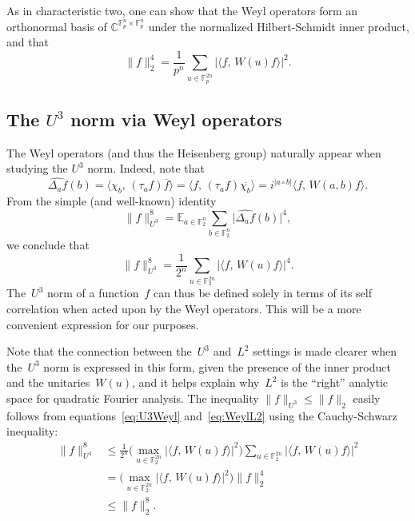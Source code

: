 \documentclass[11pt]{amsart}
\newcommand{\E}{\mathbb{E}}
\newcommand{\C}{\mathbb{C}} %
\newcommand{\F}{\mathbb{F}} %
\theoremstyle{plain}
\theoremstyle{definition}
\theoremstyle{remark}
\begin{document}
As in characteristic two, one can show that the Weyl operators form an orthonormal basis of $\C^{\F_p^n \times \F_p^n}$ under the normalized Hilbert-Schmidt inner product, and that
\begin{equation*}
\|f\|_2^4 = \frac{1}{p^n} \sum_{u\in \F_p^{2n}} |\langle f,\, W(u) f\rangle|^2.    
\end{equation*}


\subsection{The $U^3$ norm via Weyl operators}

The Weyl operators (and thus the Heisenberg group) naturally appear when studying the $U^3$ norm.
Indeed, note that
\begin{equation}\label{eq:FourierWeyl}
\widehat{\Delta_a f}(b) = \langle \chi_b,\, (\tau_a f) \overline{f}\rangle = \langle f,\, (\tau_a f) \overline{\chi_b}\rangle = i^{|a\circ b|} \langle f,\, W(a,b)f\rangle.
\end{equation}
From the simple (and well-known) identity
\begin{equation} \label{eq:U3Fourier}
    \|f\|_{U^3}^8 = \E_{a\in \F_2^n} \sum_{b\in \F_2^n} \big|\widehat{\Delta_a f}(b)\big|^4,
\end{equation}
we conclude that
\begin{equation} \label{eq:U3Weyl}
\|f\|_{U^3}^8 = \frac{1}{2^n} \sum_{u\in \F_2^{2n}} |\langle f,\, W(u) f\rangle|^4.
\end{equation}
The~$U^3$ norm of a function~$f$ can thus be defined solely in terms of its self correlation when acted upon by the Weyl operators.
This will be a more convenient expression for our purposes.

Note that the connection between the~$U^3$ and~$L^2$ settings is made clearer when the~$U^3$ norm is expressed in this form, given the presence of the inner product and the unitaries~$W(u)$, and it helps explain why~$L^2$ is the ``right'' analytic space for quadratic Fourier analysis.
The inequality $\|f\|_{U^3} \leq \|f\|_2$ easily follows from equations~\eqref{eq:U3Weyl} and~\eqref{eq:WeylL2} using the Cauchy-Schwarz inequality:
\begin{align*}
    \|f\|_{U^3}^8 &\leq \frac{1}{2^n} \Big(\max_{u\in \F_2^{2n}} |\langle f,\, W(u) f\rangle|^2\Big) \sum_{u\in \F_2^{2n}} |\langle f,\, W(u) f\rangle|^2 \\
    &= \Big(\max_{u\in \F_2^{2n}} |\langle f,\, W(u) f\rangle|^2\Big) \|f\|_2^4 \\
    &\leq \|f\|_2^8.
\end{align*}
\end{document}
